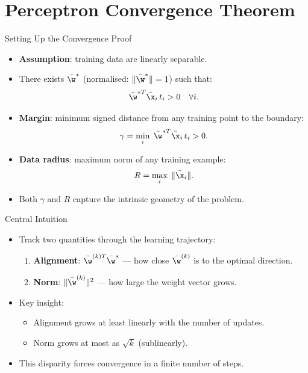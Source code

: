 \section{Perceptron Convergence Theorem}

\begin{frame}{Setting Up the Convergence Proof}
  \begin{itemize}
    \item \textbf{Assumption}: training data are \alert{linearly separable}.
    \item There exists $\bar{\w}^*$ (normalised: $\|\bar{\w}^*\| = 1$) such that:
    \[
      \bar{\w}^{*T}\bar{\x}_i\, t_i > 0 \quad \forall i.
    \]
    \item \textbf{Margin}: minimum signed distance from any training point to the boundary:
    \[
      \gamma = \min_i\; \bar{\w}^{*T}\bar{\x}_i\, t_i > 0.
    \]
    \item \textbf{Data radius}: maximum norm of any training example:
    \[
      R = \max_i\; \|\bar{\x}_i\|.
    \]
    \item Both $\gamma$ and $R$ capture the \alert{intrinsic geometry} of the problem.
  \end{itemize}
\end{frame}

\begin{frame}{Central Intuition}
  \begin{itemize}
    \item Track two quantities through the learning trajectory:
      \begin{enumerate}
        \item \textbf{Alignment}: $\bar{\w}^{(k)T}\bar{\w}^*$ — how close $\bar{\w}^{(k)}$ is to the optimal direction.
        \item \textbf{Norm}: $\|\bar{\w}^{(k)}\|^2$ — how large the weight vector grows.
      \end{enumerate}
    \item Key insight:
      \begin{itemize}
        \item Alignment grows \alert{at least linearly} with the number of updates.
        \item Norm grows \alert{at most as $\sqrt{k}$} (sublinearly).
      \end{itemize}
    \item This disparity \alert{forces convergence} in a finite number of steps.
  \end{itemize}
\end{frame}

